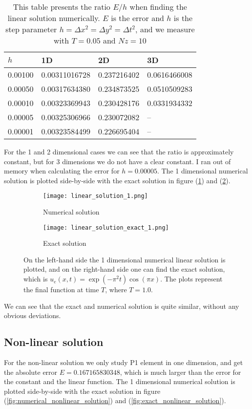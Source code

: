 \documentclass[norsk,a4paper,12pt]{article}
\begin{document}
\begin{table}[H]
\centering
\caption{This table presents the ratio $E/h$ when finding the linear solution numerically. $E$ is the error and $h$ is the step parameter $h=\Delta x^2 = \Delta y^2 = \Delta t^2$, and we measure with $T=0.05$ and $Nz=10$}
\begin{tabularx}{\textwidth}{XXXX} \hline
\label{tab:linear_E/h}
$h$ & 1D & 2D & 3D \\ \hline
0.00100 & 0.00311016728 & 0.237216402 & 0.0616466008 \\
0.00050 & 0.00317634380 & 0.234873525 & 0.0510509283 \\
0.00010 & 0.00323369943 & 0.230428176 & 0.0331934332 \\
0.00005 & 0.00325306966 & 0.230072082 & -- \\
0.00001 & 0.00323584499 & 0.226695404 & --\\ \hline
\end{tabularx}
\end{table}
For the 1 and 2 dimensional cases we can see that the ratio is approximately constant, but for 3 dimensions we do not have a clear constant. I ran out of memory when calculating the error for $h=0.00005$. The 1 dimensional numerical solution is plotted side-by-side with the exact solution in figure (\ref{fig:numerical_linear_solution}) and (\ref{fig:exact_linear_solution}).

\begin{figure}[H]
\centering
\begin{subfigure}{.6\textwidth}
  \centering
  \texttt{[image: linear\_solution\_1.png]}
  \caption{Numerical solution}
  \label{fig:numerical_linear_solution}
\end{subfigure}%
\begin{subfigure}{.6\textwidth}
  \centering
  \texttt{[image: linear\_solution\_exact\_1.png]}
  \caption{Exact solution}
  \label{fig:exact_linear_solution}
\end{subfigure}
\caption{On the left-hand side the 1 dimensional numerical linear solution is plotted, and on the right-hand side one can find the exact solution, which is $u_e(x, t)=\exp{(-\pi^2t)}\cos(\pi x)$. The plots represent the final function at time $T$, where $T=1.0$.}
\label{fig:linear_solution}
\end{figure}
We can see that the exact and numerical solution is quite similar, without any obvious deviations.

\subsection{Non-linear solution}
For the non-linear solution we only study P1 element in one dimension, and get the absolute error $E=0.167165830348$, which is much larger than the error for the constant and the linear function. The 1 dimensional numerical solution is plotted side-by-side with the exact solution in figure (\ref{fig:numerical_nonlinear_solution}) and (\ref{fig:exact_nonlinear_solution}).
\end{document}
